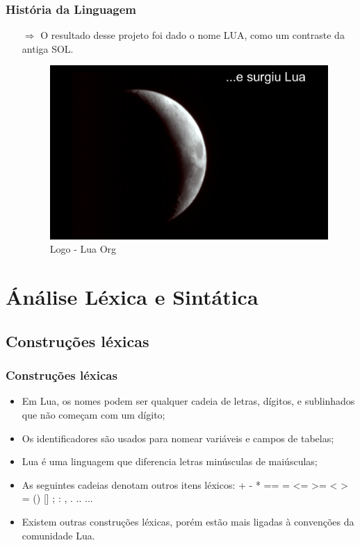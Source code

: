 \documentclass{beamer}
\begin{document}
\begin{frame}[fragile]
\frametitle{História da Linguagem}
	\begin{itemize}
		\item[$\Rightarrow$] O resultado desse projeto foi dado o nome LUA, como um contraste da antiga SOL.
		\begin{figure}[!htb]
			\centering
			\includegraphics[width=1\linewidth]{imagens/lua}
			\caption{Logo - Lua Org}
		\end{figure}
	\end{itemize}
\end{frame}

\section{Ánálise Léxica e Sintática}
\subsection{Construções léxicas}
\begin{frame}[fragile]
\frametitle{Construções léxicas}
	\begin{itemize}
	\item Em Lua, os nomes podem ser qualquer cadeia de letras, dígitos, e sublinhados que não começam com um dígito; 
	\item Os identificadores são usados para nomear variáveis e campos de tabelas;
	\item Lua é uma linguagem que diferencia letras minúsculas de maiúsculas;
	\item As seguintes cadeias denotam outros itens léxicos: + - * == = <= >= < > = () [] ; : , . .. ...
	\item Existem outras construções léxicas, porém estão mais ligadas à convenções da comunidade Lua.
	\end{itemize}
\end{frame}
\end{document}

